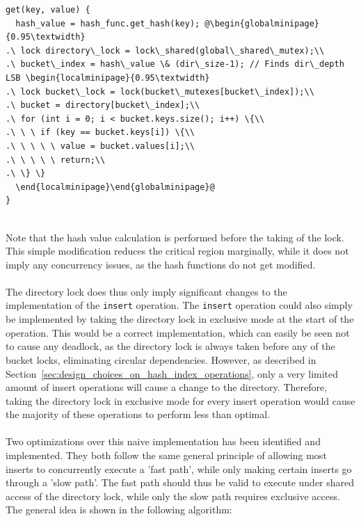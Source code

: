 \documentclass[11pt]{report} %
\begin{document}
\begin{fminipage}{\linewidth}
\begin{lstlisting}[escapechar=@]
get(key, value) {
  hash_value = hash_func.get_hash(key); @\begin{globalminipage}{0.95\textwidth}
.\ lock directory\_lock = lock\_shared(global\_shared\_mutex);\\
.\ bucket\_index = hash\_value \& (dir\_size-1); // Finds dir\_depth LSB \begin{localminipage}{0.95\textwidth}
.\ lock bucket\_lock = lock(bucket\_mutexes[bucket\_index]);\\
.\ bucket = directory[bucket\_index];\\
.\ for (int i = 0; i < bucket.keys.size(); i++) \{\\
.\ \ \ if (key == bucket.keys[i]) \{\\
.\ \ \ \ \ value = bucket.values[i];\\
.\ \ \ \ \ return;\\
.\ \} \}
  \end{localminipage}\end{globalminipage}@
}
\end{lstlisting}
\end{fminipage}
\vphantom{fill}\\
Note that the hash value calculation is performed before the taking of the lock. This simple modification reduces the critical region marginally, while it does not imply any concurrency issues, as the hash functions do not get modified.\\
\\
The directory lock does thus only imply significant changes to the implementation of the \verb|insert| operation. The \verb|insert| operation could also simply be implemented by taking the directory lock in exclusive mode at the start of the operation. This would be a correct implementation, which can easily be seen not to cause any deadlock, as the directory lock is always taken before any of the bucket locks, eliminating circular dependencies. However, as described in Section~\ref{sec:design_choices_on_hash_index_operations}, only a very limited amount of insert operations will cause a change to the directory. Therefore, taking the directory lock in exclusive mode for every insert operation would cause the majority of these operations to perform less than optimal. \\
\\
Two optimizations over this naive implementation has been identified and implemented. They both follow the same general principle of allowing most inserts to concurrently execute a 'fast path', while only making certain inserts go through a 'slow path'. The fast path should thus be valid to execute under shared access of the directory lock, while only the slow path requires exclusive access. The general idea is shown in the following algorithm: \\
\end{document}
